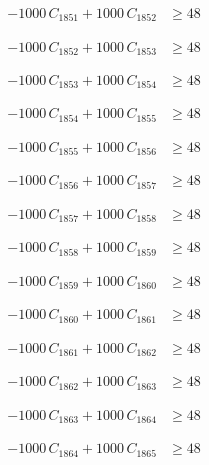 \documentclass[a4paper,11pt]{article}
\begin{document}
\begin{align}
-1000\,C_{1851} + 1000\,C_{1852} &\geq 48 \nonumber
\end{align}

\begin{align}
-1000\,C_{1852} + 1000\,C_{1853} &\geq 48 \nonumber
\end{align}

\begin{align}
-1000\,C_{1853} + 1000\,C_{1854} &\geq 48 \nonumber
\end{align}

\begin{align}
-1000\,C_{1854} + 1000\,C_{1855} &\geq 48 \nonumber
\end{align}

\begin{align}
-1000\,C_{1855} + 1000\,C_{1856} &\geq 48 \nonumber
\end{align}

\begin{align}
-1000\,C_{1856} + 1000\,C_{1857} &\geq 48 \nonumber
\end{align}

\begin{align}
-1000\,C_{1857} + 1000\,C_{1858} &\geq 48 \nonumber
\end{align}

\begin{align}
-1000\,C_{1858} + 1000\,C_{1859} &\geq 48 \nonumber
\end{align}

\begin{align}
-1000\,C_{1859} + 1000\,C_{1860} &\geq 48 \nonumber
\end{align}

\begin{align}
-1000\,C_{1860} + 1000\,C_{1861} &\geq 48 \nonumber
\end{align}

\begin{align}
-1000\,C_{1861} + 1000\,C_{1862} &\geq 48 \nonumber
\end{align}

\begin{align}
-1000\,C_{1862} + 1000\,C_{1863} &\geq 48 \nonumber
\end{align}

\begin{align}
-1000\,C_{1863} + 1000\,C_{1864} &\geq 48 \nonumber
\end{align}

\begin{align}
-1000\,C_{1864} + 1000\,C_{1865} &\geq 48 \nonumber
\end{align}
\end{document}

